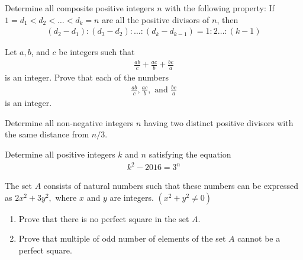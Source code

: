 \documentclass[problems.tex]{subfile}
\begin{document}
	\begin{problem}
		Determine all composite positive integers $n$ with the following property: If $1 = d_1 < d_2 <
		\dots < d_k = n$ are all the positive divisors of $n$, then
		\begin{align*}
			(d_2-d_1):(d_3-d_2):\dots : (d_k - d_{k-1}) = 1:2\dots :(k-1)
		\end{align*}
	\end{problem}

	\begin{problem}
		Let $a,b$, and $c$ be integers such that
		\begin{align*}
			\frac{ab}{c} + \frac{ac}{b} + \frac{bc}{a}
		\end{align*}
		is an integer. Prove that each of the numbers
		\begin{align*}
			\frac{ab}{c} , \frac{ac}{b}, \text{ and } \frac{bc}{a}
		\end{align*}
		is an integer.
	\end{problem}

	\begin{problem}
		Determine all non-negative integers $n$ having two distinct positive divisors with the same distance from $n/3$.
	\end{problem}

	\begin{problem}
		Determine all positive integers $k$ and $n$ satisfying the equation
		\begin{align*}
			k^2 - 2016 = 3^n
		\end{align*}
	\end{problem}

	\begin{problem}
		The set $A$ consists of natural numbers such that these numbers can be expressed as $2x^2+3y^2,$ where $x$ and $y$ are integers. $(x^2+y^2\not=0)$
		\begin{enumerate}
			\item Prove that there is no perfect square in the set $A.$
			\item Prove that multiple of odd number of elements of the set $A$ cannot be a perfect square.
		\end{enumerate}
	\end{problem}
\end{document}
